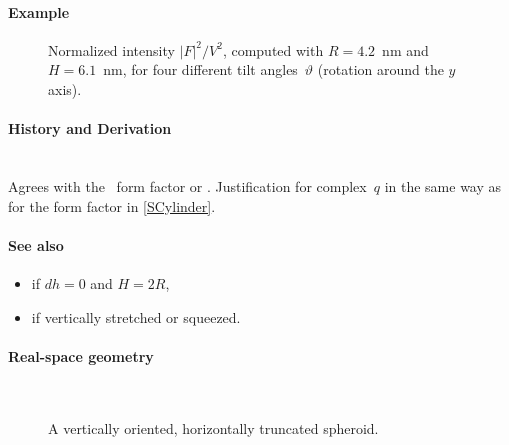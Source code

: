 \paragraph{Example}\strut

\begin{figure}[H]
\begin{center}
\end{center}
\caption{Normalized intensity $|F|^2/V^2$,
computed with $R=4.2$~nm and $H=6.1$~nm,
for four different tilt angles~$\vartheta$ (rotation around the $y$ axis).}
\end{figure}

\paragraph{History and Derivation}\strut\\
Agrees with the \IsGISAXS\ form factor
 \cite[Eq.~2.33]{Laz06} or
 \cite[Eq.~228]{ReLL09}.
Justification for complex~$q$ in the same way as for the  form factor
in \cref{SCylinder}.

\paragraph{See also}
\begin{itemize}
\item {} if $dh=0$ and $H=2R$,
\item {} if vertically stretched or squeezed.
\end{itemize}



 \label{STruncatedSpheroid}

\paragraph{Real-space geometry}\strut\\

\begin{figure}[H]
\hfill
{}
\hfill
{}
\hfill
{}
\hfill
\caption{A vertically oriented, horizontally truncated spheroid.}
\end{figure}

